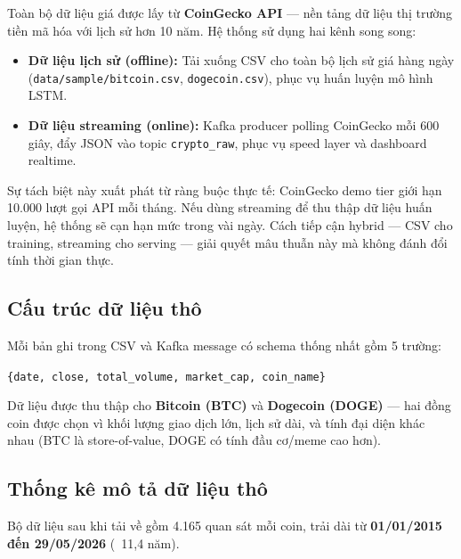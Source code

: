 \documentclass[12pt, a4paper]{report}
\begin{document}
Toàn bộ dữ liệu giá được lấy từ \textbf{CoinGecko API} \cite{ref7} --- nền tảng dữ liệu
thị trường tiền mã hóa với lịch sử hơn 10 năm. Hệ thống sử dụng hai kênh song song:

\begin{itemize}
  \item \textbf{Dữ liệu lịch sử (offline):} Tải xuống CSV cho toàn bộ lịch sử giá hàng ngày
    (\texttt{data/sample/bitcoin.csv}, \texttt{dogecoin.csv}), phục vụ huấn luyện mô hình LSTM.
  \item \textbf{Dữ liệu streaming (online):} Kafka producer polling CoinGecko mỗi 600 giây,
    đẩy JSON vào topic \texttt{crypto\_raw}, phục vụ speed layer và dashboard realtime.
\end{itemize}

Sự tách biệt này xuất phát từ ràng buộc thực tế: CoinGecko demo tier giới hạn 10.000
lượt gọi API mỗi tháng. Nếu dùng streaming để thu thập dữ liệu huấn luyện, hệ thống sẽ
cạn hạn mức trong vài ngày. Cách tiếp cận hybrid --- CSV cho training, streaming cho
serving --- giải quyết mâu thuẫn này mà không đánh đổi tính thời gian thực.

\subsection{Cấu trúc dữ liệu thô}

Mỗi bản ghi trong CSV và Kafka message có schema thống nhất gồm 5 trường:

\begin{center}
\texttt{\{date, close, total\_volume, market\_cap, coin\_name\}}
\end{center}

Dữ liệu được thu thập cho \textbf{Bitcoin (BTC)} và \textbf{Dogecoin (DOGE)} --- hai đồng
coin được chọn vì khối lượng giao dịch lớn, lịch sử dài, và tính đại diện khác nhau
(BTC là store-of-value, DOGE có tính đầu cơ/meme cao hơn).

\subsection{Thống kê mô tả dữ liệu thô}

Bộ dữ liệu sau khi tải về gồm 4.165 quan sát mỗi coin, trải dài từ
\textbf{01/01/2015 đến 29/05/2026} (~11,4 năm).
\end{document}
